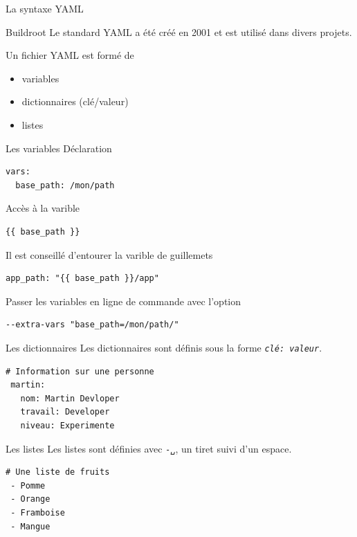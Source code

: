 \documentclass[compress]{smilebeamer}
\begin{document}
\begin{frame}
\begin{center}
\huge{La syntaxe YAML}
\end{center}
\end{frame}

\begin{frame}
\begin{exampleblock}{Buildroot}
Le standard YAML a été créé en 2001 et est utilisé dans divers projets.
\end{exampleblock}
Un fichier YAML est formé de
\begin{itemize}
	\item variables
	\item dictionnaires (clé/valeur)
	\item listes
\end{itemize}
\end{frame}

\begin{frame}[fragile]{Les variables}
Déclaration
\begin{lstlisting}[style=shell]
vars:
  base_path: /mon/path
\end{lstlisting}
Accès à la varible
\begin{lstlisting}[style=shell]
{{ base_path }}
\end{lstlisting}
Il est conseillé d'entourer la varible de guillemets
\begin{lstlisting}[style=shell]
app_path: "{{ base_path }}/app"
\end{lstlisting}
Passer les variables en ligne de commande avec l'option
\begin{lstlisting}[style=shell]
--extra-vars "base_path=/mon/path/"
\end{lstlisting}
\end{frame}

\begin{frame}[fragile]{Les dictionnaires}
Les dictionnaires sont définis sous la forme \textit{\texttt{clé: valeur}}.
\begin{lstlisting}[style=bitbake]
# Information sur une personne
 martin:
   nom: Martin Devloper
   travail: Developer
   niveau: Experimente
\end{lstlisting}
\end{frame}

\begin{frame}[fragile]{Les listes}
Les listes sont définies avec \textit{\texttt{-␣}}, un tiret suivi d’un espace.
\begin{lstlisting}[style=bitbake]
# Une liste de fruits
 - Pomme
 - Orange
 - Framboise
 - Mangue
\end{lstlisting}
\end{frame}
\end{document}

